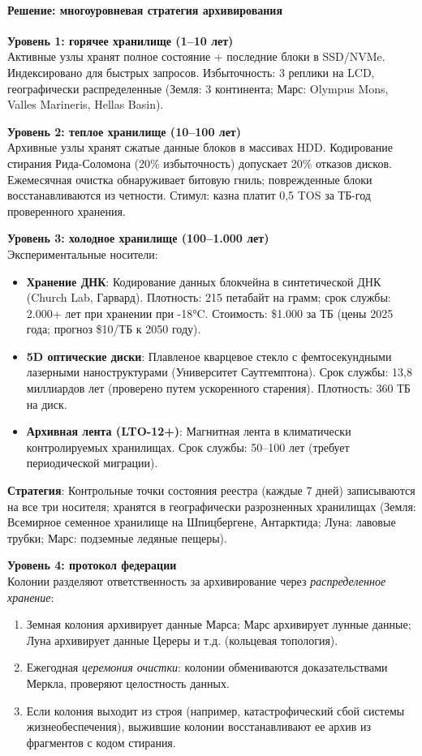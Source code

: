 \documentclass[11pt]{article}
\begin{document}
\paragraph{Решение: многоуровневая стратегия архивирования}

\textbf{Уровень 1: горячее хранилище (1--10 лет)}\\
Активные узлы хранят полное состояние + последние блоки в SSD/NVMe. Индексировано для быстрых запросов. Избыточность: 3 реплики на LCD, географически распределенные (Земля: 3 континента; Марс: Olympus Mons, Valles Marineris, Hellas Basin).

\textbf{Уровень 2: теплое хранилище (10--100 лет)}\\
Архивные узлы хранят сжатые данные блоков в массивах HDD. Кодирование стирания Рида-Соломона (20\% избыточность) допускает 20\% отказов дисков. Ежемесячная очистка обнаруживает битовую гниль; поврежденные блоки восстанавливаются из четности. Стимул: казна платит 0,5 TOS за ТБ-год проверенного хранения.

\textbf{Уровень 3: холодное хранилище (100--1.000 лет)}\\
Экспериментальные носители:
\begin{itemize}[noitemsep]
  \item \textbf{Хранение ДНК}: Кодирование данных блокчейна в синтетической ДНК (Church Lab, Гарвард). Плотность: 215 петабайт на грамм; срок службы: 2.000+ лет при хранении при -18°C. Стоимость: \$1.000 за ТБ (цены 2025 года; прогноз \$10/ТБ к 2050 году).
  \item \textbf{5D оптические диски}: Плавленое кварцевое стекло с фемтосекундными лазерными наноструктурами (Университет Саутгемптона). Срок службы: 13,8 миллиардов лет (проверено путем ускоренного старения). Плотность: 360 ТБ на диск.
  \item \textbf{Архивная лента (LTO-12+)}: Магнитная лента в климатически контролируемых хранилищах. Срок службы: 50--100 лет (требует периодической миграции).
\end{itemize}
\textbf{Стратегия}: Контрольные точки состояния реестра (каждые 7 дней) записываются на все три носителя; хранятся в географически разрозненных хранилищах (Земля: Всемирное семенное хранилище на Шпицбергене, Антарктида; Луна: лавовые трубки; Марс: подземные ледяные пещеры).

\textbf{Уровень 4: протокол федерации}\\
Колонии разделяют ответственность за архивирование через \emph{распределенное хранение}:
\begin{enumerate}[noitemsep]
  \item Земная колония архивирует данные Марса; Марс архивирует лунные данные; Луна архивирует данные Цереры и т.д. (кольцевая топология).
  \item Ежегодная \emph{церемония очистки}: колонии обмениваются доказательствами Меркла, проверяют целостность данных.
  \item Если колония выходит из строя (например, катастрофический сбой системы жизнеобеспечения), выжившие колонии восстанавливают ее архив из фрагментов с кодом стирания.
\end{enumerate}
\end{document}
